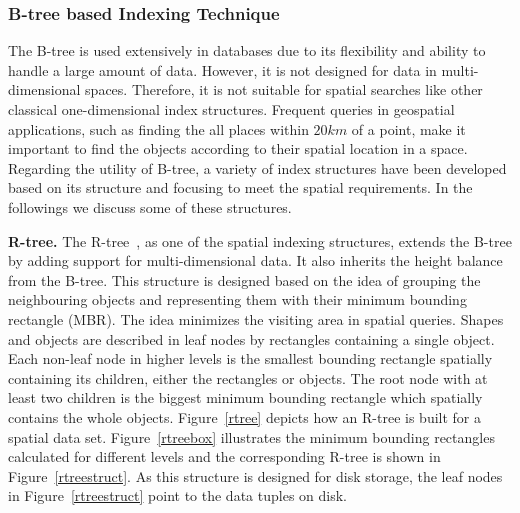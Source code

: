 \documentclass[a4paper,12pt]{article}
\begin{document}
\subsubsection{B-tree based Indexing Technique}
\label{b-tree-based}
The B-tree is used extensively in databases due to its flexibility and ability to handle a large amount of data. However, it is not designed for data in multi-dimensional spaces. Therefore, it is not suitable for spatial searches like other classical one-dimensional index structures. Frequent queries in geospatial applications, such as finding the all places within $20 km$ of a point, make it important to find the objects according to their spatial location in a space. Regarding the utility of B-tree, a variety of index structures have been developed based on its structure and focusing to meet the spatial requirements. In the followings we discuss some of these structures.

\textbf{R-tree.} The R-tree~\cite{rtree}, as one of the spatial indexing structures, extends the B-tree by adding support for multi-dimensional data. It also inherits the height balance from the B-tree. This structure is designed based on the idea of grouping the neighbouring objects and representing them with their minimum bounding rectangle (MBR). The idea minimizes the visiting area in spatial queries. Shapes and objects are described in leaf nodes by rectangles containing a single object. Each non-leaf node in higher levels is the smallest bounding rectangle spatially containing its children, either the rectangles or objects. The root node with at least two children is the biggest minimum bounding rectangle which spatially contains the whole objects. Figure~\ref{rtree} depicts how an R-tree is built for a spatial data set. Figure~\ref{rtreebox} illustrates the minimum bounding rectangles calculated for different levels
and the corresponding R-tree is shown in Figure~\ref{rtreestruct}.
As this structure is designed for disk storage, the leaf nodes in Figure~\ref{rtreestruct} point to the data tuples on disk.
\end{document}
